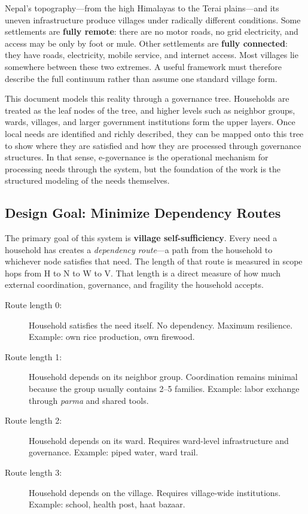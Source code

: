 \documentclass[11pt,a4paper]{article}
\begin{document}
Nepal's topography---from the high Himalayas to the Terai plains---and its uneven infrastructure produce villages under radically different conditions. Some settlements are \textbf{fully remote}: there are no motor roads, no grid electricity, and access may be only by foot or mule. Other settlements are \textbf{fully connected}: they have roads, electricity, mobile service, and internet access. Most villages lie somewhere between these two extremes. A useful framework must therefore describe the full continuum rather than assume one standard village form.

This document models this reality through a governance tree. Households are treated as the leaf nodes of the tree, and higher levels such as neighbor groups, wards, villages, and larger government institutions form the upper layers. Once local needs are identified and richly described, they can be mapped onto this tree to show where they are satisfied and how they are processed through governance structures. In that sense, e-governance is the operational mechanism for processing needs through the system, but the foundation of the work is the structured modeling of the needs themselves.

\subsection{Design Goal: Minimize Dependency Routes}

The primary goal of this system is \textbf{village self-sufficiency}. Every need a household has creates a \textit{dependency route}---a path from the household to whichever node satisfies that need. The length of that route is measured in scope hops from H to N to W to V. That length is a direct measure of how much external coordination, governance, and fragility the household accepts.

\begin{description}
    \item[Route length 0:] Household satisfies the need itself. No dependency. Maximum resilience. Example: own rice production, own firewood.
    \item[Route length 1:] Household depends on its neighbor group. Coordination remains minimal because the group usually contains 2--5 families. 
    Example: labor exchange through \textit{parma} and shared tools.
    \item[Route length 2:] Household depends on its ward. Requires ward-level infrastructure and governance. Example: piped water, ward trail.
    \item[Route length 3:] Household depends on the village. Requires village-wide institutions. Example: school, health post, haat bazaar.
\end{description}
\end{document}
